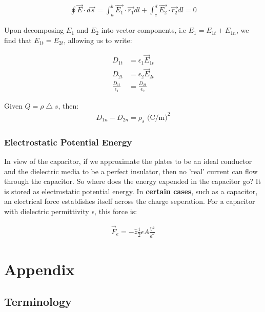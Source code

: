 \documentclass{book}
\begin{document}
\begin{align*}
	\oint \vec{E} \cdot d\vec{s} = \int_{a}^{b} \vec{E_1} \cdot \vec{r_1} dl + \int_c^d \vec{E_2} \cdot \vec{r_2} dl =0 
\end{align*}

Upon decomposing $E_1$ and $E_2$ into vector components, i.e $E_1 = E_{1t} + E_{1n}$, we find that $E_{1t} = E_{2t}$, allowing us to write:

\begin{align*}
	D_{1t} &= \epsilon_1\vec{E}_{1t} \\
	D_{2t} &= \epsilon_2\vec{E}_{2t} \\
	\frac{D_{1t}}{\epsilon_1} & = \frac{D_{2t}}{\epsilon_2}
\end{align*}


Given $Q=\rho \bigtriangleup s$, then:
\begin{align*}
	D_{1n} - D_{2n} = \rho_s \text{ (C/m)}^2
\end{align*}
\subsection{Electrostatic Potential Energy}

In view of the capacitor, if we approximate the plates to be an ideal conductor and the dielectric media to be a perfect insulator, then no 'real' current can flow through the capacitor. So where does the energy expended in the capacitor go? It is stored as electrostatic potential energy. In \textbf{certain cases}, such as a capacitor, an electrical force establishes itself across the charge seperation. For a capacitor with dielectric permittivity $\epsilon$, this force is:

\begin{align*}
	\vec{F}_e = - \hat{z} \frac{1}{2} \epsilon A \frac{V^2}{d^2}
\end{align*}

\chapter{Appendix}

\section{Terminology}
\end{document}
